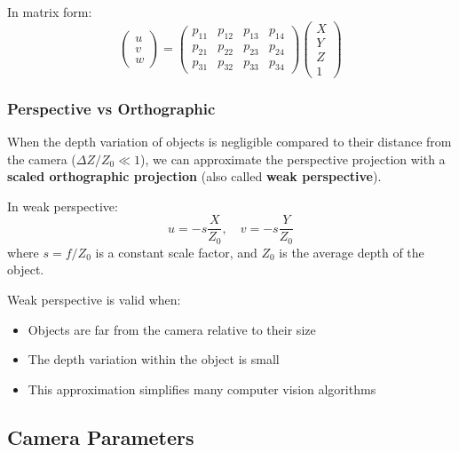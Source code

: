 \documentclass[11pt,a4paper]{article}
\theoremstyle{definition}
\theoremstyle{plain}
\theoremstyle{remark}
\begin{document}
In matrix form:
\begin{equation} \nonumber
    \begin{pmatrix} u \\ v \\ w \end{pmatrix} = \begin{pmatrix}
    p_{11} & p_{12} & p_{13} & p_{14} \\
    p_{21} & p_{22} & p_{23} & p_{24} \\
    p_{31} & p_{32} & p_{33} & p_{34}
    \end{pmatrix} \begin{pmatrix} X \\ Y \\ Z \\ 1 \end{pmatrix}
\end{equation}

\subsubsection{Perspective vs Orthographic}

When the depth variation of objects is negligible compared to their distance from the camera ($\Delta Z / Z_0 \ll 1$), we can approximate the perspective projection with a \textbf{scaled orthographic projection} (also called \textbf{weak perspective}).

In weak perspective:
\begin{equation} \label{eq:weak_perspective}
    u = -s \frac{X}{Z_0}, \quad v = -s \frac{Y}{Z_0}
\end{equation}
where $s = f/Z_0$ is a constant scale factor, and $Z_0$ is the average depth of the object.

\begin{tcolorbox}[colback=purple!5!white,colframe=purple!75!black,title=\textbf{Weak Perspective Approximation}]
Weak perspective is valid when:
\begin{itemize}
    \item Objects are far from the camera relative to their size
    \item The depth variation within the object is small
    \item This approximation simplifies many computer vision algorithms
\end{itemize}
\end{tcolorbox}

\subsection{Camera Parameters}
\end{document}
